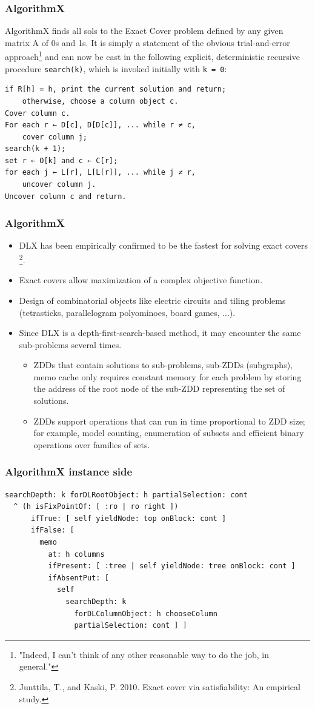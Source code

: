 \documentclass[10pt]{beamer}
\begin{document}
\begin{frame}[fragile]
\frametitle{AlgorithmX}
AlgorithmX finds all sols to the Exact Cover problem defined by any given matrix A of 0s and 1s. It is simply a statement of the obvious trial-and-error approach\footnote{"Indeed, I can’t think of any other reasonable way to do the job, in general."} and can now be cast in the following explicit, deterministic recursive procedure \verb|search(k)|, which is invoked initially with \verb|k = 0|:
\vfill
\begin{Verbatim}[fontsize=\small]
if R[h] = h, print the current solution and return;
	otherwise, choose a column object c.
Cover column c.
For each r ← D[c], D[D[c]], ... while r ≠ c,
	cover column j;
search(k + 1);
set r ← O[k] and c ← C[r];
for each j ← L[r], L[L[r]], ... while j ≠ r,
	uncover column j.
Uncover column c and return.
\end{Verbatim}
\end{frame}

\begin{frame}[fragile]
\frametitle{AlgorithmX}
\begin{itemize}
	\item DLX has been empirically confirmed to be the fastest for solving exact covers
		\footnote{Junttila, T., and Kaski, P. 2010. Exact cover via satisfiability: An empirical study.}.
	\item Exact covers allow maximization of a complex objective function.
	\item Design of combinatorial objects like electric circuits and tiling problems (tetrasticks, parallelogram polyominoes, board games, ...).
	\item Since DLX is a depth-first-search-based method, it may encounter the same sub-problems several times.
	\begin{itemize}
		\item ZDDs that contain solutions to sub-problems, sub-ZDDs (subgraphs), memo cache only requires constant memory for each problem by storing the address of the root node of the sub-ZDD representing the set of solutions.
		\item ZDDs support operations that can run in time proportional to ZDD size; for example, model counting, enumeration of subsets and efficient binary operations over families of sets.
	\end{itemize}
\end{itemize}
\end{frame}

\begin{frame}[fragile]
\frametitle{AlgorithmX instance side}
\begin{verbatim}
searchDepth: k forDLRootObject: h partialSelection: cont
  ^ (h isFixPointOf: [ :ro | ro right ])
      ifTrue: [ self yieldNode: top onBlock: cont ]
      ifFalse: [ 
        memo
          at: h columns
          ifPresent: [ :tree | self yieldNode: tree onBlock: cont ]
          ifAbsentPut: [ 
            self
              searchDepth: k
                forDLColumnObject: h chooseColumn
                partialSelection: cont ] ]
\end{verbatim}
\end{frame}
\end{document}
